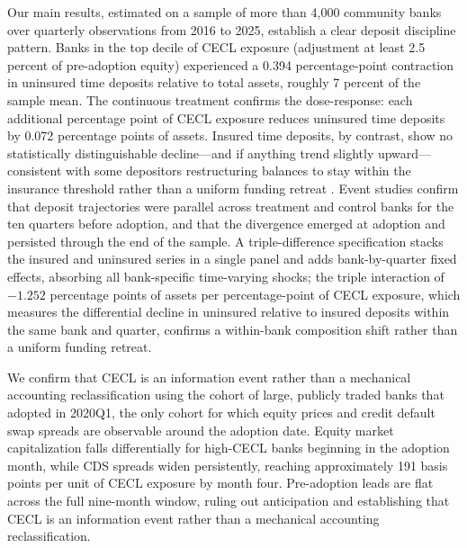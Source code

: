 Our main results, estimated on a sample of more than 4,000 community banks over
quarterly observations from 2016 to 2025, establish a clear deposit discipline
pattern.  Banks in the top decile of CECL exposure (adjustment at least 2.5
percent of pre-adoption equity) experienced a 0.394 percentage-point contraction
in uninsured time deposits relative to total assets, roughly 7 percent of the
sample mean.  The continuous treatment confirms the dose-response: each
additional percentage point of CECL exposure reduces uninsured time deposits by
0.072 percentage points of assets.  Insured time deposits, by contrast, show no
statistically distinguishable decline---and if anything trend slightly
upward---consistent with some depositors restructuring balances to stay within
the insurance threshold rather than a uniform funding retreat \citep{martin2026deposit}.  Event studies
confirm that deposit trajectories were parallel across treatment and control banks
for the ten quarters before adoption, and that the divergence emerged at adoption
and persisted through the end of the sample.  A triple-difference specification
stacks the insured and uninsured series in a single panel and adds
bank-by-quarter fixed effects, absorbing all bank-specific time-varying shocks;
the triple interaction of $-1.252$ percentage points of assets per
percentage-point of CECL exposure, which measures the differential decline in
uninsured relative to insured deposits within the same bank and quarter, confirms
a within-bank composition shift rather than a uniform funding retreat.

We confirm that CECL is an information event rather than a mechanical accounting
reclassification using the cohort of large, publicly traded banks that adopted in
2020Q1, the only cohort for which equity prices and credit default swap spreads
are observable around the adoption date.  Equity market capitalization falls
differentially for high-CECL banks beginning in the adoption month, while CDS
spreads widen persistently, reaching approximately 191 basis points per unit of
CECL exposure by month four.  Pre-adoption leads are flat across the full
nine-month window, ruling out anticipation and establishing that CECL is an
information event rather than a mechanical accounting reclassification.

